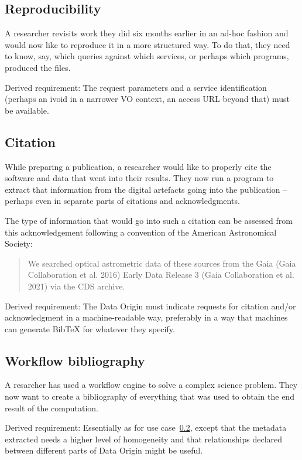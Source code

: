 \documentclass[11pt,a4paper]{ivoa}
\begin{document}
\subsection{Reproducibility} 

A researcher revisits work they did six months earlier in an ad-hoc fashion and would now like to reproduce it in a more structured way. To do that, they need to know, say, which queries against which services, or perhaps which programs, produced the files.
	
Derived requirement: The request parameters and a service identification
(perhaps an ivoid in a narrower VO context, an access URL beyond that) must be available.
	
\subsection{Citation} 
\label{sec:req-citation}

While preparing a publication, a researcher would like to properly cite the software and data that went into their results. They now run a program to extract that information from the digital artefacts going into the publication -- perhaps even in separate parts of citations and acknowledgments.

The type of information that would go into such a
citation can be assessed from this acknowledgement following a
convention of the American Astronomical Society:

\begin{quotation}
We searched optical astrometric data of these sources from the Gaia (Gaia Collaboration et al. 2016) Early Data Release 3 (Gaia Collaboration et al. 2021) via the CDS archive.
\end{quotation}

Derived requirement: The Data Origin must indicate requests for citation
and/or acknowledgment in a machine-readable way, preferably in a way
that machines can generate BibTeX for whatever they specify.
	
	
\subsection{Workflow bibliography} 

A resarcher has used a workflow engine to solve a complex science
problem.  They now want to create a bibliography of everything that was
used to obtain the end result of the computation.

Derived requirement: Essentially as for use case~\ref{sec:req-citation},
except that the metadata extracted needs a higher level of homogeneity
and that relationships declared between different parts of Data Origin
might be useful.
\end{document}
